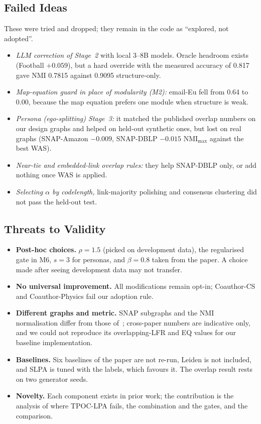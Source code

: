 \documentclass[conference]{IEEEtran}
\begin{document}
\subsection{Failed Ideas}\label{sec:neg}
These were tried and dropped; they remain in the code as ``explored, not adopted''.
\begin{itemize}
\item \emph{LLM correction of Stage~2} with local 3--8B models. Oracle headroom exists (Football $+0.059$), but a hard override with the measured accuracy of 0.817 gave NMI 0.7815 against 0.9095 structure-only.
\item \emph{Map-equation guard in place of modularity (M2):} email-Eu fell from 0.64 to 0.00, because the map equation prefers one module when structure is weak.
\item \emph{Persona (ego-splitting) Stage~3:} it matched the published overlap numbers on our design graphs and helped on held-out synthetic ones, but lost on real graphs (SNAP-Amazon $-0.009$, SNAP-DBLP $-0.015$ $\mathrm{NMI}_{\max}$ against the best WAS).
\item \emph{Near-tie and embedded-link overlap rules:} they help SNAP-DBLP only, or add nothing once WAS is applied.
\item \emph{Selecting $\alpha$ by codelength,} link-majority polishing and consensus clustering did not pass the held-out test.
\end{itemize}

\subsection{Threats to Validity}\label{sec:limits}
\begin{itemize}
\item \textbf{Post-hoc choices.} $\rho=1.5$ (picked on development data), the regularised gate in M6, $s=3$ for personas, and $\beta=0.8$ taken from the paper. A choice made after seeing development data may not transfer.
\item \textbf{No universal improvement.} All modifications remain opt-in; Coauthor-CS and Coauthor-Physics fail our adoption rule.
\item \textbf{Different graphs and metric.} SNAP subgraphs and the NMI normalisation differ from those of~\cite{kong2026}; cross-paper numbers are indicative only, and we could not reproduce its overlapping-LFR and EQ values for our baseline implementation.
\item \textbf{Baselines.} Six baselines of the paper are not re-run, Leiden is not included, and SLPA is tuned with the labels, which favours it. The overlap result rests on two generator seeds.
\item \textbf{Novelty.} Each component exists in prior work; the contribution is the analysis of where TPOC-LPA fails, the combination and the gates, and the comparison.
\end{itemize}
\end{document}
